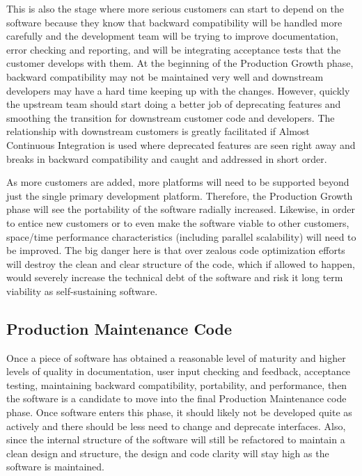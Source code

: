 \documentclass[11pt]{SANDreport}
\begin{document}
This is also the stage where more serious customers can start to
depend on the software because they know that backward compatibility
will be handled more carefully and the development team will be trying
to improve documentation, error checking and reporting, and will be
integrating acceptance tests that the customer develops with them.  At
the beginning of the Production Growth phase, backward compatibility
may not be maintained very well and downstream developers may have a
hard time keeping up with the changes.  However, quickly the upstream
team should start doing a better job of deprecating features and
smoothing the transition for downstream customer code and developers.
The relationship with downstream customers is greatly facilitated if
Almost Continuous Integration {}\cite{SoftwareIntegrationforCSE09} is
used where deprecated features are seen right away and breaks in
backward compatibility and caught and addressed in short order.

As more customers are added, more platforms will need to be supported
beyond just the single primary development platform.  Therefore, the
Production Growth phase will see the portability of the software
radially increased.  Likewise, in order to entice new customers or to
even make the software viable to other customers, space/time
performance characteristics (including parallel scalability) will need
to be improved.  The big danger here is that over zealous code
optimization efforts will destroy the clean and clear structure of the
code, which if allowed to happen, would severely increase the
technical debt of the software and risk it long term viability as
self-sustaining software.


%
{}\subsection{Production Maintenance Code}
%

Once a piece of software has obtained a reasonable level of maturity
and higher levels of quality in documentation, user input checking and
feedback, acceptance testing, maintaining backward compatibility,
portability, and performance, then the software is a candidate to move
into the final Production Maintenance code phase.  Once software
enters this phase, it should likely not be developed quite as actively
and there should be less need to change and deprecate interfaces.
Also, since the internal structure of the software will still be
refactored to maintain a clean design and structure, the design and
code clarity will stay high as the software is maintained.
\end{document}

